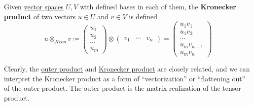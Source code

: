 	\begin{definition}
	  \label{def:kronecker-product}
    Given \hyperref[def:vector-space]{vector spaces} $U, V$ with defined bases in each of them, the \textbf{Kronecker product} of two vectors $u \in U$ and $v \in V$ is defined
		\begin{equation}
			u \otimes_{Kron} v \coloneqq \begin{pmatrix}
				u_1 \\ u_2 \\ \cdots \\ u_m
				\end{pmatrix} \otimes \begin{pmatrix}
				v_1 & \cdots & v_n
				\end{pmatrix} = \begin{pmatrix}
				u_1 v_1 \\ u_1 v_2 \\ \cdots \\ u_m v_{n-1} \\ u_m v_n 
			\end{pmatrix}
		\end{equation}
  \end{definition}

  Clearly, the \hyperref[def:outer-product]{outer product} and \hyperref[def:kronecker-product]{Kronecker product} are closely related, and we can interpret the Kronecker product as a form of ``vectorization'' or ``flattening out'' of the outer product. The outer product is the matrix realization of the tensor product.  

